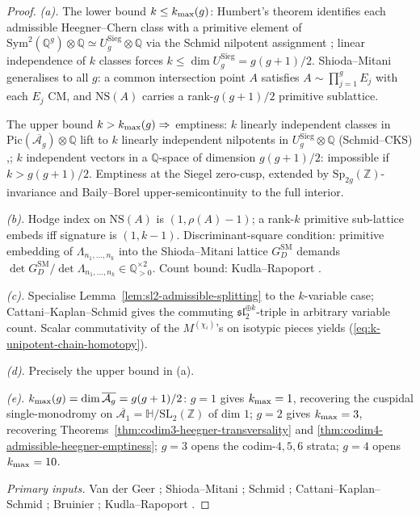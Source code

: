\begin{proof}
\emph{(a).} The lower bound $k\le k_{\max}(g)$: Humbert's theorem
\cite[\S 9.1]{VanDerGeer1988} identifies each admissible
Heegner--Chern class with a primitive element of
$\mathrm{Sym}^2(\mathbb Q^g)\otimes\mathbb Q\simeq U^{\mathrm{Sieg}}_g\otimes\mathbb Q$
via the Schmid nilpotent assignment
\cite[\S 5, Thm.~5.13]{Schmid1973}; linear independence of $k$
classes forces $k\le\dim U^{\mathrm{Sieg}}_g=g(g+1)/2$.
Shioda--Mitani \cite[\S 1]{ShiodaMitani1974} generalises to all
$g$: a common intersection point $A$ satisfies
$A\sim\prod_{j=1}^{g}E_j$ with each $E_j$ CM, and
$\mathrm{NS}(A)$ carries a rank-$g(g+1)/2$ primitive sublattice.

The upper bound $k>k_{\max}(g)\Rightarrow$ emptiness:
$k$ linearly independent classes in $\mathrm{Pic}(\overline{\mathcal A_g})\otimes\mathbb Q$
lift to $k$ linearly independent nilpotents in
$U^{\mathrm{Sieg}}_g\otimes\mathbb Q$ (Schmid--CKS)
\cite[\S 5]{Schmid1973},\cite[Cor.~3.13]{CattaniKaplanSchmid1986};
$k$ independent vectors in a $\mathbb Q$-space of dimension
$g(g+1)/2$: impossible if $k>g(g+1)/2$. Emptiness at the Siegel
zero-cusp, extended by $\mathrm{Sp}_{2g}(\mathbb Z)$-invariance and
Baily--Borel upper-semicontinuity to the full interior.

\emph{(b).} Hodge index on $\mathrm{NS}(A)$ is $(1,\rho(A)-1)$; a
rank-$k$ primitive sub-lattice embeds iff signature is $(1,k-1)$.
Discriminant-square condition: primitive embedding of
$\Lambda_{n_1,\ldots,n_k}$ into the Shioda--Mitani lattice
$G^{\mathrm{SM}}_D$ demands
$\det G^{\mathrm{SM}}_D/\det\Lambda_{n_1,\ldots,n_k}\in\mathbb Q_{>0}^{\times 2}$.
Count bound: Kudla--Rapoport \cite[\S 3]{KudlaRapoport2000}.

\emph{(c).} Specialise
Lemma~\textup{\ref{lem:sl2-admissible-splitting}} to the
$k$-variable case; Cattani--Kaplan--Schmid
\cite[Thm.~3.3]{CattaniKaplanSchmid1986} gives the commuting
$\mathfrak{sl}_2^{\oplus k}$-triple in arbitrary variable count.
Scalar commutativity of the $M^{(\chi_i)}$'s on isotypic pieces
yields \textup{(\ref{eq:k-unipotent-chain-homotopy})}.

\emph{(d).} Precisely the upper bound in (a).

\emph{(e).} $k_{\max}(g)=\dim\overline{\mathcal A_g}=g(g+1)/2$:
$g=1$ gives $k_{\max}=1$, recovering the cuspidal single-monodromy on
$\overline{\mathcal A_1}=\mathbb H/\mathrm{SL}_2(\mathbb Z)$ of
dim $1$; $g=2$ gives $k_{\max}=3$, recovering
Theorems~\textup{\ref{thm:codim3-heegner-transversality}} and
\textup{\ref{thm:codim4-admissible-heegner-emptiness}}; $g=3$
opens the codim-$4,5,6$ strata; $g=4$ opens $k_{\max}=10$.

\emph{Primary inputs.} Van der Geer
\cite[Ch.~IX, \S 1]{VanDerGeer1988}; Shioda--Mitani
\cite[\S 1]{ShiodaMitani1974}; Schmid
\cite[\S 5, Thm.~5.13]{Schmid1973}; Cattani--Kaplan--Schmid
\cite[Thm.~3.3, \S 3.7, Cor.~3.13]{CattaniKaplanSchmid1986};
Bruinier \cite[Thm.~3.22]{Bruinier2002}; Kudla--Rapoport
\cite[\S 3]{KudlaRapoport2000}.
\end{proof}

